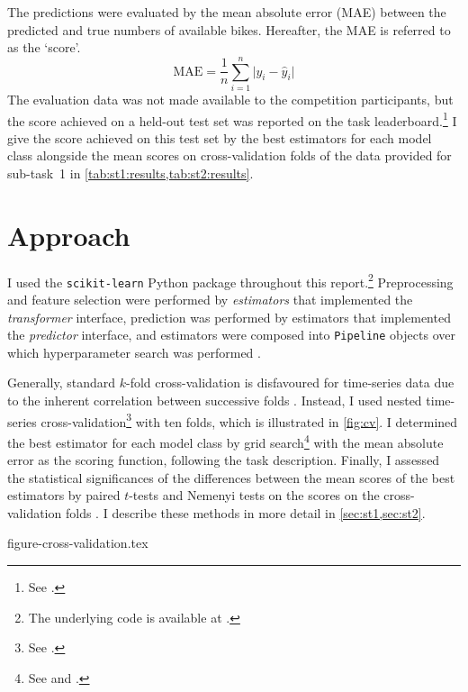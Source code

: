 \documentclass[11pt]{extarticle}
\begin{document}
The predictions were evaluated by the mean absolute error (MAE) between the predicted
and true numbers of available bikes.
Hereafter, the MAE is referred to as the `score'.
\begin{equation}
  \text{MAE} = \frac{1}{n} \sum_{i = 1}^n \lvert y_i - \hat{y}_i \rvert
\end{equation}
The evaluation data was not made available to the competition participants, but the
score achieved on a held-out test set was reported on the task
leaderboard.\footnote{See .
}
I give the score achieved on this test set by the best estimators for each model class
alongside the mean scores on cross-validation folds of the data provided for sub-task~1
in \cref{tab:st1:results,tab:st2:results}.

\section{Approach}
\label{sec:approach}

I used the \texttt{scikit-learn} Python package \parencite{Pedregosa2011} throughout
this report.\footnote{The underlying code is available at
  .
}
Preprocessing and feature selection were performed by \emph{estimators} that
implemented the \emph{transformer} interface, prediction was performed by estimators
that implemented the \emph{predictor} interface, and estimators were composed into
\texttt{Pipeline} objects over which hyperparameter search was performed
\parencite[4-9]{Buitinck2013}.

Generally, standard $k$-fold cross-validation is disfavoured for time-series data due
to the inherent correlation between successive folds \parencite{Bergmeir2018}.
Instead, I used nested time-series cross-validation\footnote{See
  .
} with ten folds, which is illustrated in
\cref{fig:cv}.
I determined the best estimator for each model class by grid search\footnote{See
   and
  .
} with the mean absolute error as the scoring function, following the task description.
Finally, I assessed the statistical significances of the differences between the mean
scores of the best estimators by paired $t$-tests and Nemenyi tests on the scores on
the cross-validation folds \parencite[353-354]{Flach2012}.
I describe these methods in more detail in \cref{sec:st1,sec:st2}.

{figure-cross-validation.tex}
\end{document}
